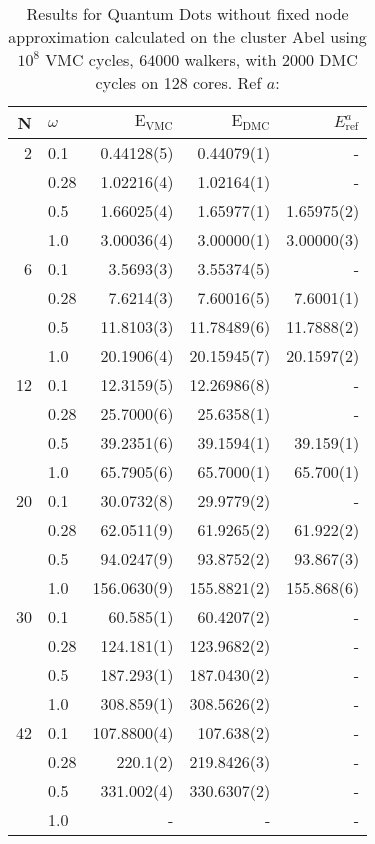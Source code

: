 \begin{table}
\begin{center}
\begin{tabular}{rl|rrr}
    N     & $\omega$ & $\mathrm{E_{VMC}}$ & $\mathrm{E_{DMC}}$ & $E_\mathrm{ref}^a$\\
\hline\hline
    2     &   0.1    & 0.44128(5) & 0.44079(1)     & - \\
          &   0.28   & 1.02216(4) & 1.02164(1)     & - \\
          &   0.5    & 1.66025(4) & 1.65977(1)     & 1.65975(2) \\
          &   1.0    & 3.00036(4) & 3.00000(1)     & 3.00000(3) \\
\hline        
    6     &   0.1    & 3.5693(3)   & 3.55374(5)    & -\\
          &   0.28   & 7.6214(3)   & 7.60016(5)    & 7.6001(1) \\ 
          &   0.5    & 11.8103(3)  & 11.78489(6)   & 11.7888(2)\\
          &   1.0    & 20.1906(4)  & 20.15945(7)   & 20.1597(2) \\
\hline
    12    &   0.1    & 12.3159(5)  & 12.26986(8)  & -\\
          &   0.28   & 25.7000(6)  & 25.6358(1)   & -\\
          &   0.5    & 39.2351(6)  & 39.1594(1)   & 39.159(1) \\
          &   1.0    & 65.7905(6)  & 65.7000(1)   & 65.700(1)\\
\hline
    20    &   0.1    & 30.0732(8)  & 29.9779(2)  & -\\
          &   0.28   & 62.0511(9)  & 61.9265(2)  & 61.922(2) \\
          &   0.5    & 94.0247(9)  & 93.8752(2)  & 93.867(3) \\
          &   1.0    & 156.0630(9) & 155.8821(2) & 155.868(6) \\
\hline
    30    &   0.1    & 60.585(1)   & 60.4207(2)  & - \\
          &   0.28   & 124.181(1)  & 123.9682(2) & -\\
          &   0.5    & 187.293(1)  & 187.0430(2) & - \\
          &   1.0    & 308.859(1)  & 308.5626(2) & -\\
\hline
    42    &   0.1    &  107.8800(4)  & 107.638(2)   & -\\
          &   0.28   &  220.1(2)     & 219.8426(3)  & - \\
          &   0.5    & 331.002(4)    & 330.6307(2)  & - \\
          &   1.0    & -             &  -           & - \\

\end{tabular}
\caption{Results for Quantum Dots without fixed node approximation calculated on the cluster Abel using $10^8$ VMC cycles, $64000$ walkers, with $2000$ DMC cycles on 128 cores. Ref $a$: \cite{MagnusArticle}}
\end{center}
\end{table}

